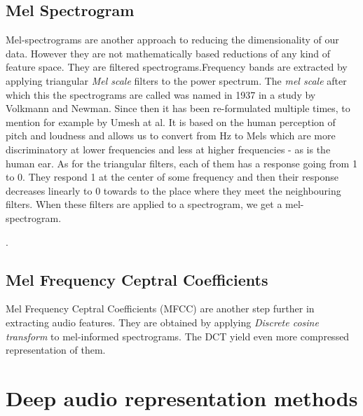 \subsection{Mel Spectrogram}
Mel-spectrograms are another approach to reducing the dimensionality of our data. However they are not mathematically based reductions of any kind of feature space. They are filtered spectrograms.Frequency bands are extracted by applying triangular \textit{Mel scale} filters to the power spectrum. The \textit{mel scale} after which this the spectrograms are called was named in 1937 in a study \cite{1937ASAJ....8..185S} by Volkmann and Newman. Since then it has been re-formulated multiple times, to mention for example \cite{mel_scale_fit} by Umesh at al. It is based on the human perception of pitch and loudness and allows us to convert from Hz to Mels which are more discriminatory at lower frequencies and less at higher frequencies - as is the human ear. As for the triangular filters, each of them has a response going from 1 to 0. They respond 1 at the center of some frequency and then their response decreases linearly to 0 towards to the place where they meet the neighbouring filters. When these filters are applied to a spectrogram, we get a mel-spectrogram.

. 

\subsection{Mel Frequency Ceptral Coefficients}
Mel Frequency Ceptral Coefficients (MFCC) are another step further in extracting audio features. They are obtained by applying \textit{Discrete cosine transform} to mel-informed spectrograms. The DCT yield even more compressed representation of them.

\section{Deep audio representation methods}


